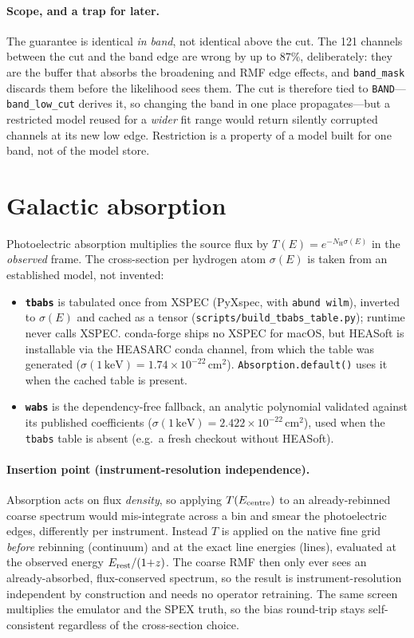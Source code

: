 \documentclass[11pt,a4paper]{article}
\newcommand{\nh}{N_{\mathrm{H}}}
\newcommand{\kev}{\,\mathrm{keV}}
\newcommand{\code}[1]{\texttt{#1}}
\begin{document}
\paragraph{Scope, and a trap for later.} The guarantee is identical
\emph{in band}, not identical above the cut. The 121 channels between the cut
and the band edge are wrong by up to $87\%$, deliberately: they are the buffer
that absorbs the broadening and RMF edge effects, and \code{band\_mask}
discards them before the likelihood sees them. The cut is therefore tied to
\code{BAND}---\code{band\_low\_cut} derives it, so changing the band in one
place propagates---but a restricted model reused for a \emph{wider} fit range
would return silently corrupted channels at its new low edge. Restriction is a
property of a model built for one band, not of the model store.

\section{Galactic absorption}
Photoelectric absorption multiplies the source flux by
$T(E)=e^{-\nh\sigma(E)}$ in the \emph{observed} frame. The cross-section per
hydrogen atom $\sigma(E)$ is taken from an established model, not invented:

\begin{itemize}
\item \textbf{\code{tbabs}} \citep*{wilms2000} is tabulated once from XSPEC
(PyXspec, with \code{abund wilm}), inverted to $\sigma(E)$ and cached as a tensor
(\code{scripts/build\_tbabs\_table.py}); runtime never calls XSPEC. conda-forge
ships no XSPEC for macOS, but HEASoft is installable via the HEASARC conda
channel, from which the table was generated
($\sigma(1\kev)=1.74\times10^{-22}\,\mathrm{cm^2}$). \code{Absorption.default()}
uses it when the cached table is present.
\item \textbf{\code{wabs}} \citep*{morrison1983} is the dependency-free fallback,
an analytic polynomial validated against its published coefficients
($\sigma(1\kev)=2.422\times10^{-22}\,\mathrm{cm^2}$), used when the \code{tbabs}
table is absent (e.g.\ a fresh checkout without HEASoft).
\end{itemize}

\paragraph{Insertion point (instrument-resolution independence).}
Absorption acts on flux \emph{density}, so applying $T(E_{\rm centre})$ to an
already-rebinned coarse spectrum would mis-integrate across a bin and smear the
photoelectric edges, differently per instrument. Instead $T$ is applied on the
native fine grid \emph{before} rebinning (continuum) and at the exact line
energies (lines), evaluated at the observed energy $E_{\rm rest}/(1{+}z)$. The
coarse RMF then only ever sees an already-absorbed, flux-conserved spectrum, so
the result is instrument-resolution independent by construction and needs no
operator retraining. The same screen multiplies the emulator and the SPEX
truth, so the bias round-trip stays self-consistent regardless of the
cross-section choice.
\end{document}
